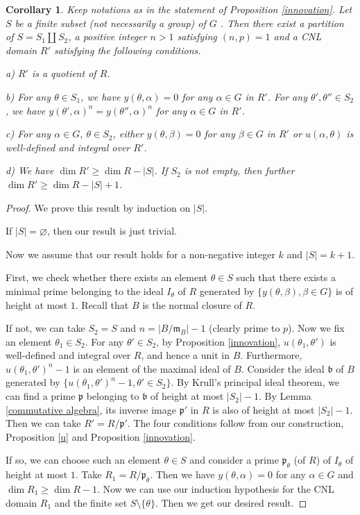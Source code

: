 \documentclass[12pt]{amsart}
\theoremstyle{plain}
\newtheorem{cor}[thm]{Corollary}
\theoremstyle{definition}
\theoremstyle{remark}
\begin{document}
\begin{cor}\label{innovation'}
	Keep notations as in the statement of Proposition \ref{innovation}. Let $S$ be a finite subset (not necessarily a group) of $G$ . Then there exist a partition of $S = S_1 \amalg S_2$, a positive integer $n>1$ satisfying $(n, p)=1$ and a CNL domain $R'$ satisfying the following conditions.
	
	a) $R'$ is a quotient of $R$.
	
	b) For any $\theta \in S_1$, we have $y(\theta, \alpha)=0$ for any $\alpha \in G$ in $R'$. For any $\theta', \theta'' \in S_2$, we have $y(\theta', \alpha)^n=y(\theta'', \alpha)^n$ for any $\alpha \in G$ in $R'$.
	
	c) For any $\alpha \in G,~\theta \in S_2$, either $ y(\theta, \beta)=0$ for any $\beta \in G$ in $R'$ or $u(\alpha, \theta)$ is well-defined and integral over $R'$.
	
	d) We have $\operatorname{dim} R' \ge \operatorname{dim} R - |S|$. If $S_2$ is not empty, then further $\operatorname{dim} R' \ge \operatorname{dim} R - |S|+1$.
	
\end{cor}

\begin{proof}
	We prove this result by induction on $|S|$.
	
	If $|S|=\varnothing$, then our result is just trivial.
	
	Now we assume that our result holds for a non-negative integer $k$ and $|S|=k+1$.
	
	First, we check whether there exists an element $\theta \in S$ such that there exists a minimal prime belonging to the ideal $I_{\theta}$ of $R$ generated by $\{y(\theta, \beta), \beta \in G\}$ is of height at most $1$. Recall that $B$ is the normal closure of $R$.
	
	If not, we can take $S_2=S$ and $n= |B/\mathfrak{m}_B|-1 $ (clearly prime to $p$). Now we fix an element $\theta_1 \in S_2$. For any $\theta' \in S_2$, by Proposition \ref{innovation},  $u(\theta_1, \theta')$ is well-defined and integral over $R$, and hence a unit in $B$. Furthermore, $u(\theta_1, \theta')^n -1$ is an element of the maximal ideal of $B$. Consider the ideal $\mathfrak{b}$ of $B$ generated by $\{u(\theta_1, \theta')^n -1, \theta' \in S_2\}$. By Krull's principal ideal theorem, we can find a prime $\mathfrak{p}$ belonging to $\mathfrak{b}$ of height at most $|S_2|-1$. By Lemma \ref{commutative algebra}, its inverse image $\mathfrak{p}'$ in $R$ is also of height at most $|S_2|-1$. Then we can take $R'=R/\mathfrak{p}'$. The four conditions follow from our construction, Proposition \ref{u} and Proposition \ref{innovation}.
	
	If so, we can choose such an element $\theta \in S$ and consider a prime $\mathfrak{p}_\theta$ (of $R$) of $I_\theta$ of height at most $1$. Take $R_1=R/\mathfrak{p}_\theta$. Then we have $y(\theta, \alpha)=0$ for any $\alpha \in G$ and $\operatorname{dim} R_1 \ge \operatorname{dim} R - 1$.  Now we can use our induction hypothesis for the CNL domain $ R_1$ and the finite set $S\setminus \{\theta\}$. Then we get our desired result.
\end{proof}
\end{document}
